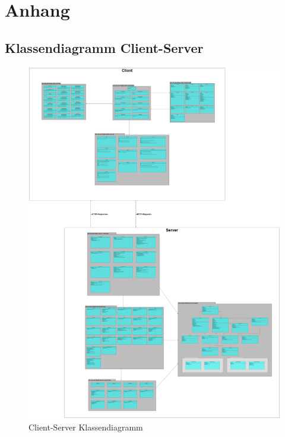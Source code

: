 \documentclass[a4paper]{scrreprt}
\begin{document}
\chapter{Anhang}
\section{Klassendiagramm Client-Server}
 \begin{figure}[H]
	       \centering
	       \includegraphics[scale=0.055]{client_server_klassen.png}
	       \caption{Client-Server Klassendiagramm}
	      \end{figure}
\end{document}
